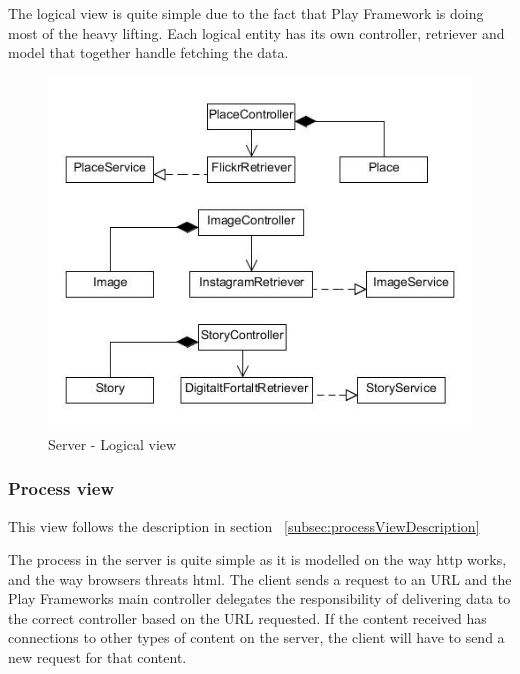 \documentclass[11pt]{book}
\begin{document}
The logical view is quite simple due to the fact that Play Framework is doing most of the heavy lifting. Each logical entity has its own controller, retriever and model that together handle fetching the data.

\begin{figure}[H]
      \centering
      \includegraphics[width=1.0\textwidth]{Figures/Architecture/serverLogical.jpg}
      \caption{Server - Logical view}
      \label{fig:arch_server_logical}
\end{figure}

\subsubsection{Process view}
This view follows the description in section ~\ref{subsec:processViewDescription}

The process in the server is quite simple as it is modelled on the way \gls{http} works, and the way browsers threats \gls{html}. The client sends a request to an URL and the Play Frameworks main controller delegates the  responsibility of delivering data to the correct controller based on the URL requested. If the content received has connections to other types of content on the server, the client will have to send a new request for that content.
\end{document}
